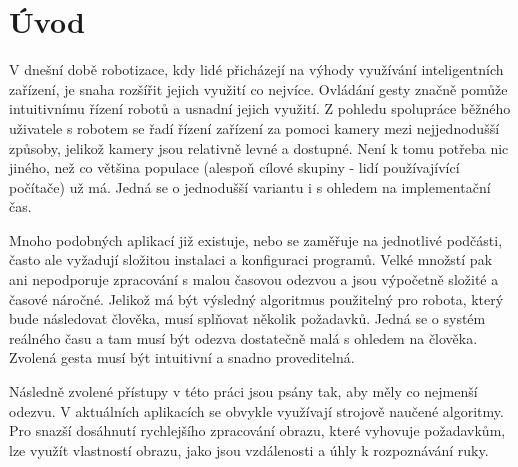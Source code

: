 \chapter{Úvod}
V dnešní době robotizace, kdy lidé přicházejí na výhody využívání inteligentních zařízení, je snaha rozšířit jejich využití co nejvíce. Ovládání gesty značně pomůže intuitivnímu řízení robotů a usnadní jejich využití.
Z pohledu spolupráce běžného uživatele s robotem se řadí řízení zařízení za pomoci kamery mezi nejjednodušší způsoby, jelikož kamery jsou relativně levné a dostupné. Není k tomu potřeba nic jiného, než co většina populace (alespoň cílové skupiny - lidí používajívící počítače) už má. Jedná se o jednodušší variantu i s ohledem na implementační čas.

Mnoho podobných aplikací již existuje, nebo se zaměřuje na jednotlivé podčásti, často ale vyžadují složitou instalaci a konfiguraci programů. Velké množstí pak ani nepodporuje zpracování s malou časovou odezvou a jsou výpočetně složité a časové náročné.
Jelikož má být výsledný algoritmus použitelný pro robota, který  bude  následovat člověka, musí splňovat několik požadavků. Jedná se o systém reálného času a tam musí být odezva dostatečně malá s ohledem na člověka. Zvolená gesta musí být intuitivní a snadno proveditelná. 		%

Následně zvolené přístupy v této práci jsou psány tak, aby měly co nejmenší odezvu. 
V aktuálních aplikacích se obvykle využívají strojově naučené algoritmy. Pro snazší dosáhnutí rychlejšího zpracování obrazu, které vyhovuje požadavkům, lze využít vlastností obrazu, jako jsou vzdálenosti a úhly k rozpoznávání ruky.

\endinput